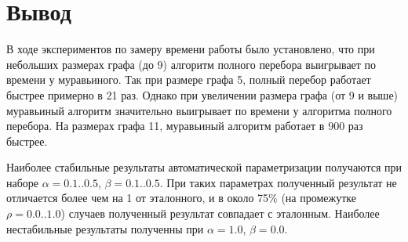     \section{Вывод}
        В ходе экспериментов по замеру времени работы было установлено, что 
        при небольших размерах графа (до 9) алгоритм полного перебора 
        выигрывает по времени у муравьиного. 
        Так при размере графа 5, полный перебор работает быстрее примерно в 21 раз.
        Однако при увеличении размера графа (от 9 и выше) муравьиный алгоритм 
        значительно выигрывает по времени у алгоритма полного перебора.
        На размерах графа 11, муравьиный алгоритм работает в 900 раз быстрее.

        Наиболее стабильные результаты автоматической параметризации получаются
        при наборе $\alpha = 0.1..0.5$, $\beta = 0.1..0.5$. 
        При таких параметрах полученный результат не отличается более чем на 1 от эталонного,
        и в около 75\% (на промежутке $\rho = 0.0..1.0$) случаев полученный результат совпадает с эталонным.
        Наиболее нестабильные результаты полученны при $\alpha = 1.0$, $\beta = 0.0$.

\newpage